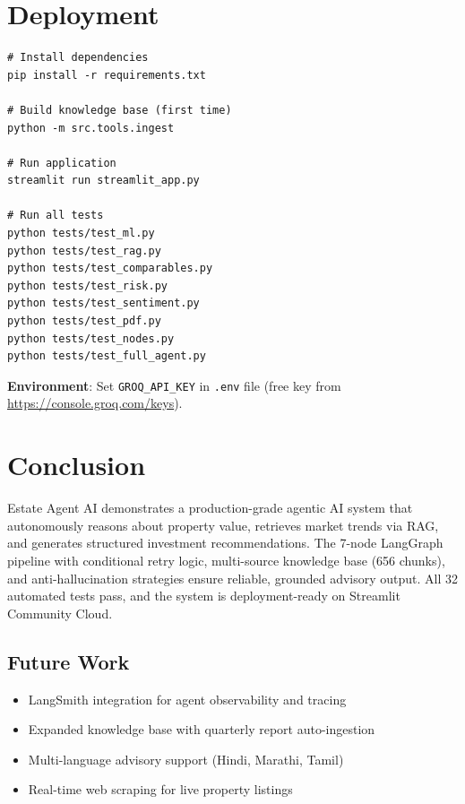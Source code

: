 \documentclass[12pt,a4paper]{article}
\begin{document}
\section{Deployment}

\begin{lstlisting}[basicstyle=\ttfamily\small, frame=single, breaklines=true]
# Install dependencies
pip install -r requirements.txt

# Build knowledge base (first time)
python -m src.tools.ingest

# Run application
streamlit run streamlit_app.py

# Run all tests
python tests/test_ml.py
python tests/test_rag.py
python tests/test_comparables.py
python tests/test_risk.py
python tests/test_sentiment.py
python tests/test_pdf.py
python tests/test_nodes.py
python tests/test_full_agent.py
\end{lstlisting}

\textbf{Environment}: Set \texttt{GROQ\_API\_KEY} in \texttt{.env} file (free key from \url{https://console.groq.com/keys}).

\section{Conclusion}

Estate Agent AI demonstrates a production-grade agentic AI system that autonomously reasons about property value, retrieves market trends via RAG, and generates structured investment recommendations. The 7-node LangGraph pipeline with conditional retry logic, multi-source knowledge base (656 chunks), and anti-hallucination strategies ensure reliable, grounded advisory output. All 32 automated tests pass, and the system is deployment-ready on Streamlit Community Cloud.

\subsection{Future Work}
\begin{itemize}[noitemsep]
    \item LangSmith integration for agent observability and tracing
    \item Expanded knowledge base with quarterly report auto-ingestion
    \item Multi-language advisory support (Hindi, Marathi, Tamil)
    \item Real-time web scraping for live property listings
\end{itemize}
\end{document}
